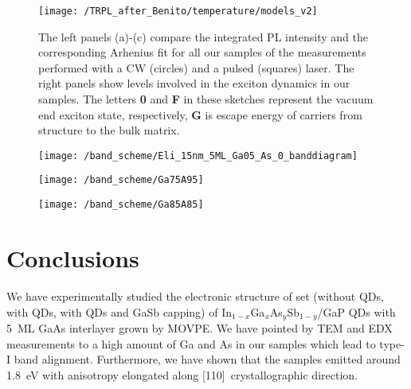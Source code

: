 \begin{figure}
	\centering
	\texttt{[image: /TRPL\_after\_Benito/temperature/models\_v2]} %
	\caption{The left panels (a)-(c) compare the integrated PL intensity and the corresponding Arhenius fit for all our samples of the measurements performed with a CW (circles) and a pulsed (squares) laser. The right panels show levels involved in the exciton dynamics in our samples. The letters \textbf{0} and \textbf{F} in these sketches represent the vacuum end exciton state, respectively, \textbf{G} is escape energy of carriers from structure to the bulk matrix.}
	\label{fig:Arrhenius_PLandTRPL}
\end{figure}
\newpage 


\begin{figure}
	\centering
	\texttt{[image: /band\_scheme/Eli\_15nm\_5ML\_Ga05\_As\_0\_banddiagram]} %
	\caption{}
	\label{fig:Band_scheme_wo}
\end{figure}


\begin{figure}
	\centering
	\texttt{[image: /band\_scheme/Ga75A95]}%
	\caption{}
	\label{fig:Band_scheme_with}
\end{figure}

\begin{figure}
	\centering
	\texttt{[image: /band\_scheme/Ga85A85]}%
	\caption{}
	\label{fig:Band_scheme_cap}
\end{figure}

\section{Conclusions}
We have experimentally studied the electronic structure of set (without QDs, with QDs, with QDs and GaSb capping) of In$_{1-x}$Ga$_{x}$As$_y$Sb$_{1-y}$/GaP QDs with 5~ML GaAs interlayer grown by MOVPE. We have pointed by TEM and EDX measurements to a high amount of Ga and As in our samples which lead to type-I band alignment. Furthermore, we have shown that the samples emitted around 1.8~eV with anisotropy elongated along [110]~crystallographic direction.   %

{\color{green}{Podívej se i zpět do textu, přibyly tam modre podbarvene texty
	
	Zmínit, že se povedlo narůst 5ML GaAs vrstvu}} {\color{red}{CO DÁL???}}